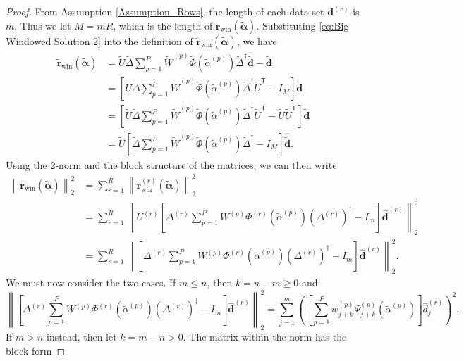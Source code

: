 \documentclass[12pt]{article}
\newcommand{\dVec}{\mathbf{d}}	%
\newcommand{\rVec}{\mathbf{r}}	%
\newcommand{\trans}[1]{{#1}^\mathsf{T}}	%
\newcommand{\pinv}[1]{{#1}^\dagger}	%
\newcommand{\dft}[1]{\widehat{#1}}	%
\newcommand{\regparam}{\alpha}  %
\newcommand{\regparamVec}{\bm{\regparam}}   %
\newcommand{\regparamBig}{\widetilde{\regparam}}   %
\newcommand{\regparamVecBig}{\widetilde{\regparamVec}}   %
\newcommand{\rBig}{\widetilde{\rVec}}	%
\newcommand{\rWinBig}{\rBig_{\text{win}}}	%
\newcommand{\dBig}{\widetilde{\dVec}}	%
\newcommand{\svd}[1]{\widehat{#1}}	%
\newcommand{\rWin}{\rVec_{\text{win}}}	%
\begin{document}
\begin{proof}
From Assumption \ref{Assumption_Rows}, the length of each data set $\dVec^{(r)}$ is $m$. Thus we let $M = mR$, which is the length of $\rWinBig(\regparamVecBig)$. Substituting \eqref{eq:Big Windowed Solution 2} into the definition of $\rWinBig(\regparamVecBig)$, we have
\begin{align*}
    \rWinBig(\regparamVecBig) &= \widetilde{U}\widetilde{\Delta}\sum_{p=1}^{P} \widetilde{W}^{(p)}\widetilde{\Phi}\left(\widetilde{\regparam}^{(p)}\right)\pinv{\widetilde{\Delta}}\dft{\dBig} - \dBig \\
    &= \left[\widetilde{U}\widetilde{\Delta}\sum_{p=1}^{P} \widetilde{W}^{(p)}\widetilde{\Phi}\left(\widetilde{\regparam}^{(p)}\right)\pinv{\widetilde{\Delta}}\trans{\widetilde{U}} - I_M\right]\dBig \\
    &= \left[\widetilde{U}\widetilde{\Delta}\sum_{p=1}^{P} \widetilde{W}^{(p)}\widetilde{\Phi}\left(\widetilde{\regparam}^{(p)}\right)\pinv{\widetilde{\Delta}}\trans{\widetilde{U}} - \widetilde{U}\trans{\widetilde{U}}\right]\dBig \\
    &= \widetilde{U}\left[\widetilde{\Delta}\sum_{p=1}^{P} \widetilde{W}^{(p)}\widetilde{\Phi}\left(\widetilde{\regparam}^{(p)}\right)\pinv{\widetilde{\Delta}} - I_M\right]\svd{\dBig}.
\end{align*}
Using the 2-norm and the block structure of the matrices, we can then write
\begin{align*}
    \left\|\rWinBig(\regparamVecBig)\right\|_2^2 &= \sum_{r=1}^{R}\left\|\rWin^{(r)}(\regparamVecBig)\right\|_2^2 \\
    &= \sum_{r=1}^{R} \left\|U^{(r)}\left[\Delta^{(r)}\sum_{p=1}^{P} W^{(p)}\Phi^{(r)}\left(\widetilde{\regparam}^{(p)}\right)\pinv{\left(\Delta^{(r)}\right)} - I_m\right]\svd{\dVec}^{(r)}\right\|_2^2 \\
    &= \sum_{r=1}^{R} \left\|\left[\Delta^{(r)}\sum_{p=1}^{P} W^{(p)}\Phi^{(r)}\left(\widetilde{\regparam}^{(p)}\right)\pinv{\left(\Delta^{(r)}\right)} - I_m\right]\svd{\dVec}^{(r)}\right\|_2^2.
\end{align*}
We must now consider the two cases. If $m \leq n$, then $k = n - m \geq 0$ and 
\[\left\|\left[\Delta^{(r)}\sum_{p=1}^{P} W^{(p)}\Phi^{(r)}\left(\widetilde{\regparam}^{(p)}\right)\pinv{\left(\Delta^{(r)}\right)} - I_m\right]\svd{\dVec}^{(r)}\right\|_2^2 = \sum_{j=1}^{m} \left(\left[\sum_{p=1}^{P} w_{j+k}^{(p)}\Psi_{j+k}^{(p)}\left(\regparamBig^{(p)}\right)\right] \hat{d}_j^{(r)}\right)^2.\]
If $m > n$ instead, then let $k = m - n > 0$. The matrix within the norm has the block form

\end{proof}
\end{document}
